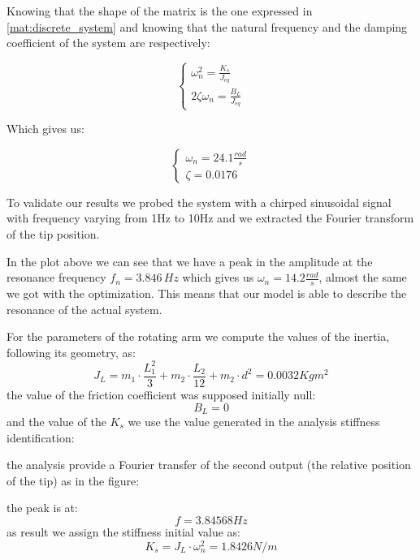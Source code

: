             Knowing that the shape of the matrix is the one expressed in \ref{mat:discrete_system} and knowing that the natural frequency and the damping coefficient of the system are respectively:

            \begin{equation*}
                \begin{cases}
                    \omega_n^2 = \frac{K_s}{J_{eq}} \\
                    2\zeta\omega_n = \frac{B_L}{J_{eq}}
                \end{cases}
            \end{equation*}

            Which gives us:

            \begin{equation*}
                \begin{cases}
                    \omega_n = 24.1 \frac{rad}{s} \\
                    \zeta = 0.0176
                \end{cases}
            \end{equation*}

            To validate our results we probed the system with a chirped sinusoidal signal with frequency varying from 1Hz to 10Hz and we extracted the Fourier transform of the tip position.


            In the plot above we can see that we have a peak in the amplitude at the resonance frequency $f_n = 3.846 \, Hz$ which gives us $\omega_n = 14.2 \frac{rad}{s}$, almost the same we got with the optimization. This means that our model is able to describe the resonance of the actual system.

            For the parameters of the rotating arm we compute the values of the inertia, following its geometry, as:
                \[
                    J_L = m_1 \cdot \frac{L_1^2}{3} + m_2 \cdot \frac{L_2}{12} + m_2 \cdot d^2 = 0.0032 Kg m^2\]
            the value of the friction coefficient was supposed initially null:
                \[
                    B_L = 0\]
            and the value of the $K_s$ we use the value generated in the analysis stiffness identification:
                
            the analysis provide a Fourier transfer of the second output (the relative position of the tip) as in the figure:
            
            the peak is at:
            \[
                f = 3.84568 Hz\]
            as result we assign the stiffness initial value as:
            \[
                    K_s = J_L \cdot \omega_n^2 = 1.8426 N/m \]

            